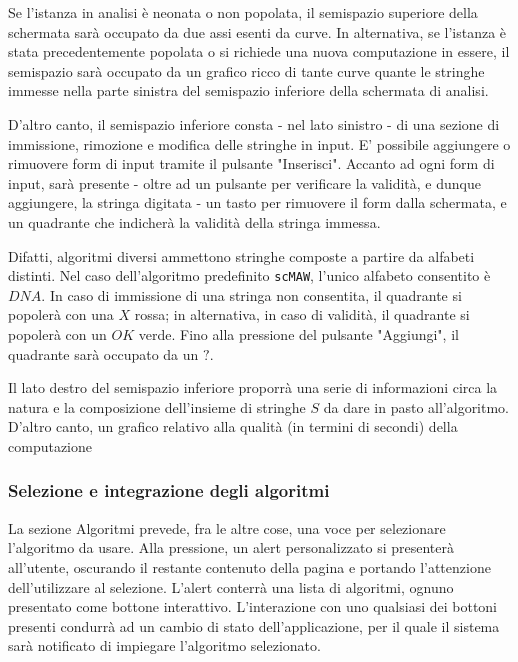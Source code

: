 \vspace{3mm}

Se l'istanza in analisi è neonata o non popolata, il semispazio superiore della schermata sarà occupato da due assi esenti da curve. In alternativa, se l'istanza è stata precedentemente popolata o si richiede una nuova computazione in essere, il semispazio sarà occupato da un grafico ricco di tante curve quante le stringhe immesse nella parte sinistra del semispazio inferiore della schermata di analisi.

\vspace{3mm}

D'altro canto, il semispazio inferiore consta - nel lato sinistro -  di una sezione di immissione, rimozione e modifica delle stringhe in input. E' possibile aggiungere o rimuovere form di input tramite il pulsante "Inserisci". Accanto ad ogni form di input, sarà presente - oltre ad un pulsante per verificare la validità, e dunque aggiungere, la stringa digitata - un tasto per rimuovere il form dalla schermata, e un quadrante che indicherà la validità della stringa immessa. 

\vspace{3mm}

Difatti, algoritmi diversi ammettono stringhe composte a partire da alfabeti distinti. Nel caso dell'algoritmo predefinito \verb|scMAW|, l'unico alfabeto consentito è $DNA$. In caso di immissione di una stringa non consentita, il quadrante si popolerà con una $X$ rossa; in alternativa, in caso di validità, il quadrante si popolerà con un $OK$ verde. Fino alla pressione del pulsante "Aggiungi", il quadrante sarà occupato da un $?$.

\vspace{3mm}

Il lato destro del semispazio inferiore proporrà una serie di informazioni circa la natura e la composizione dell'insieme di stringhe $S$ da dare in pasto all'algoritmo. D'altro canto, un grafico relativo alla qualità (in termini di secondi) della computazione

\subsubsection{Selezione e integrazione degli algoritmi}

La sezione Algoritmi prevede, fra le altre cose, una voce per selezionare l'algoritmo da usare. Alla pressione, un alert personalizzato si presenterà all'utente, oscurando il restante contenuto della pagina e portando l'attenzione dell'utilizzare al selezione. L'alert conterrà una lista di algoritmi, ognuno presentato come bottone interattivo. L'interazione con uno qualsiasi dei bottoni presenti condurrà ad un cambio di stato dell'applicazione, per il quale il sistema sarà notificato di impiegare l'algoritmo selezionato.

